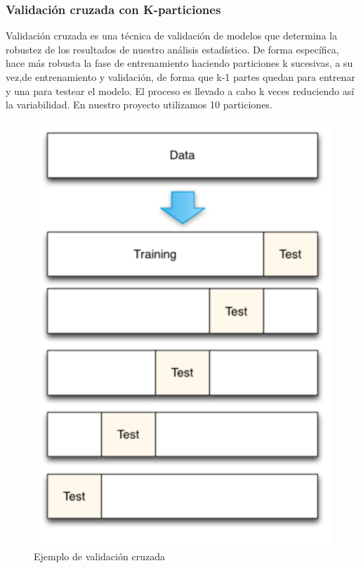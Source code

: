 \subsubsection{Validación cruzada con K-particiones}

Validación cruzada es una técnica de validación de modelos que determina la robustez de los resultados de nuestro análisis estadístico. De forma específica, hace más robusta la fase de entrenamiento haciendo particiones k sucesivas, a su vez,de entrenamiento y validación, de forma que k-1 partes quedan para entrenar y una para testear el modelo. El proceso es llevado a cabo k veces reduciendo así la variabilidad. En nuestro proyecto utilizamos 10 particiones.

\begin{figure}[H] %
	\centering
	\includegraphics[scale=0.5]{cv.png}  %
	\caption{Ejemplo de validación cruzada} 
	\label{fig:cv}
\end{figure}

